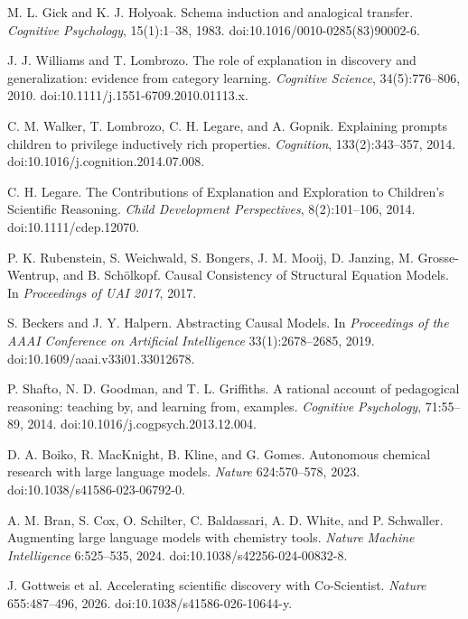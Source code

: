 M. L. Gick and K. J. Holyoak. Schema induction and analogical transfer. \emph{Cognitive Psychology}, 15(1):1--38, 1983. doi:10.1016/0010-0285(83)90002-6.

J. J. Williams and T. Lombrozo. The role of explanation in discovery and generalization: evidence from category learning. \emph{Cognitive Science}, 34(5):776--806, 2010. doi:10.1111/j.1551-6709.2010.01113.x.

C. M. Walker, T. Lombrozo, C. H. Legare, and A. Gopnik. Explaining prompts children to privilege inductively rich properties. \emph{Cognition}, 133(2):343--357, 2014. doi:10.1016/j.cognition.2014.07.008.

C. H. Legare. The Contributions of Explanation and Exploration to Children's Scientific Reasoning. \emph{Child Development Perspectives}, 8(2):101--106, 2014. doi:10.1111/cdep.12070.

P. K. Rubenstein, S. Weichwald, S. Bongers, J. M. Mooij, D. Janzing, M. Grosse-Wentrup, and B. Sch\"olkopf. Causal Consistency of Structural Equation Models. In \emph{Proceedings of UAI 2017}, 2017.

S. Beckers and J. Y. Halpern. Abstracting Causal Models. In \emph{Proceedings of the AAAI Conference on Artificial Intelligence} 33(1):2678--2685, 2019. doi:10.1609/aaai.v33i01.33012678.

P. Shafto, N. D. Goodman, and T. L. Griffiths. A rational account of pedagogical reasoning: teaching by, and learning from, examples. \emph{Cognitive Psychology}, 71:55--89, 2014. doi:10.1016/j.cogpsych.2013.12.004.

D. A. Boiko, R. MacKnight, B. Kline, and G. Gomes. Autonomous chemical research with large language models. \emph{Nature} 624:570--578, 2023. doi:10.1038/s41586-023-06792-0.

A. M. Bran, S. Cox, O. Schilter, C. Baldassari, A. D. White, and P. Schwaller. Augmenting large language models with chemistry tools. \emph{Nature Machine Intelligence} 6:525--535, 2024. doi:10.1038/s42256-024-00832-8.

J. Gottweis et al. Accelerating scientific discovery with Co-Scientist. \emph{Nature} 655:487--496, 2026. doi:10.1038/s41586-026-10644-y.
